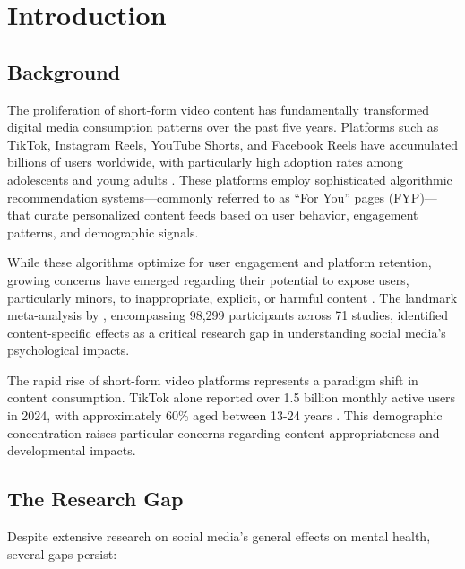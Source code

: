 \documentclass[12pt,a4paper]{article}
\begin{document}
\newpage

\section{Introduction}

\subsection{Background}

The proliferation of short-form video content has fundamentally transformed digital media consumption patterns over the past five years. Platforms such as TikTok, Instagram Reels, YouTube Shorts, and Facebook Reels have accumulated billions of users worldwide, with particularly high adoption rates among adolescents and young adults \citep{anderson2023teens}. These platforms employ sophisticated algorithmic recommendation systems---commonly referred to as ``For You'' pages (FYP)---that curate personalized content feeds based on user behavior, engagement patterns, and demographic signals.

While these algorithms optimize for user engagement and platform retention, growing concerns have emerged regarding their potential to expose users, particularly minors, to inappropriate, explicit, or harmful content \citep{nguyen2025feeds}. The landmark meta-analysis by \citet{nguyen2025feeds}, encompassing 98,299 participants across 71 studies, identified content-specific effects as a critical research gap in understanding social media's psychological impacts.

The rapid rise of short-form video platforms represents a paradigm shift in content consumption. TikTok alone reported over 1.5 billion monthly active users in 2024, with approximately 60\% aged between 13-24 years \citep{datareportal2024}. This demographic concentration raises particular concerns regarding content appropriateness and developmental impacts.

\subsection{The Research Gap}

Despite extensive research on social media's general effects on mental health, several gaps persist:
\end{document}
